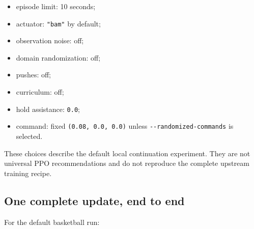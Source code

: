 \documentclass[
  american,
  11pt,
  letterpaper,
]{article}
\providecommand{\tightlist}{%
  \setlength{\itemsep}{0pt}\setlength{\parskip}{0pt}}
\begin{document}
\begin{itemize}
\tightlist
\item
  episode limit: 10 seconds;
\item
  actuator: \texttt{"bam"} by default;
\item
  observation noise: off;
\item
  domain randomization: off;
\item
  pushes: off;
\item
  curriculum: off;
\item
  hold assistance: \texttt{0.0};
\item
  command: fixed \texttt{(0.08,\ 0.0,\ 0.0)} unless
  \texttt{-\allowbreak{}-\allowbreak{}randomiz\allowbreak{}ed-\allowbreak{}commands\allowbreak{}}
  is selected.
\end{itemize}

These choices describe the default local continuation experiment. They
are not universal PPO recommendations and do not reproduce the complete
upstream training recipe.

\subsection{One complete update, end to
end}\label{one-complete-update-end-to-end}

For the default basketball run:
\end{document}
